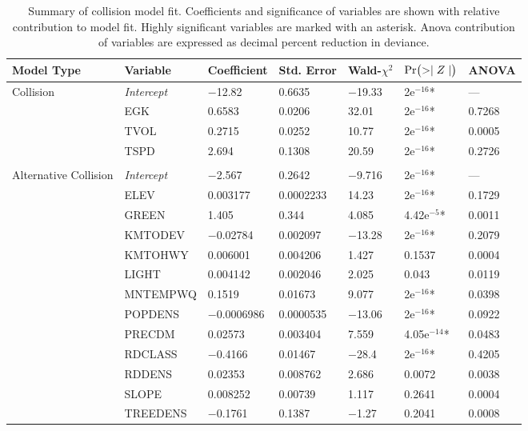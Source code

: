 \begin{table}[!t]
\caption[Summary of collision and alternative collision models]{Summary of collision model fit. Coefficients and significance of variables are shown with relative contribution to model fit. Highly significant variables are marked with an asterisk. Anova contribution of variables are expressed as decimal percent reduction in deviance.}
\centering
\begin{tabularx}{0.9\textwidth}{lllllll} \toprule
Model Type &Variable         &Coefficient &Std. Error			&Wald-$\chi^2$ &$\text{Pr}\bigl( >\mid Z \mid \bigr)$ &ANOVA\\ \midrule 
Collision  				&\emph{Intercept}	& $-$12.82			& 0.6635   	& $-$19.33	&\TL 2e$^{-16}$*	& --- \\
           				& EGK				& 0.6583			& 0.0206   	& 32.01		&\TL 2e$^{-16}$*	& 0.7268 \\
           				& TVOL				& 0.2715			& 0.0252   	& 10.77		&\TL 2e$^{-16}$*	& 0.0005 \\
           				& TSPD				& 2.694				& 0.1308   	& 20.59		&\TL 2e$^{-16}$*	& 0.2726 \\
           				&                  	&                 	&         	&         	&       	& \\
Alternative Collision	& \emph{Intercept} 	& $-$2.567 			& 0.2642	& $-$9.716 	&\TL 2e$^{-16}$*	& --- \\ 
   						& ELEV				& 0.003177			& 0.0002233	& 14.23 	&\TL 2e$^{-16}$*	& 0.1729 \\ 
   						& GREEN				& 1.405				& 0.344 	& 4.085		& 4.42e$^{-5}$*	& 0.0011 \\ 
   						& KMTODEV			& $-$0.02784			& 0.002097 	& $-$13.28 	&\TL 2e$^{-16}$*	& 0.2079 \\ 
   						& KMTOHWY			& 0.006001			& 0.004206 	& 1.427 	& 0.1537 	& 0.0004 \\ 
   						& LIGHT				& 0.004142			& 0.002046 	& 2.025 	& 0.043 	& 0.0119 \\ 
   						& MNTEMPWQ			& 0.1519			& 0.01673 	& 9.077 	&\TL 2e$^{-16}$*	& 0.0398 \\ 
   						& POPDENS			& $-$0.0006986		& 0.0000535	& $-$13.06 	&\TL 2e$^{-16}$*	& 0.0922 \\ 
   						& PRECDM			& 0.02573			& 0.003404 	& 7.559 	& 4.05e$^{-14}$*	& 0.0483 \\ 
   						& RDCLASS			& $-$0.4166			& 0.01467 	& $-$28.4 	&\TL 2e$^{-16}$*	& 0.4205 \\ 
   						& RDDENS			& 0.02353			& 0.008762 	& 2.686 	& 0.0072 	& 0.0038 \\ 
   						& SLOPE				& 0.008252			& 0.00739 	& 1.117 	& 0.2641	& 0.0004 \\ 
   						& TREEDENS			& $-$0.1761			& 0.1387 	& $-$1.27 	& 0.2041	& 0.0008 \\ 
\bottomrule
\end{tabularx}
\label{egk_sum_coll}
\end{table}

